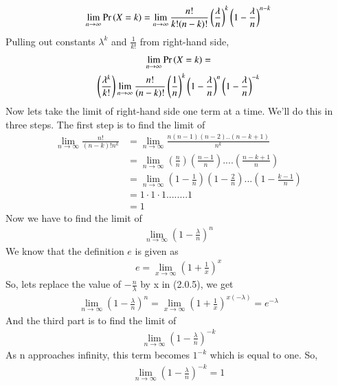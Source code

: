 \documentclass[journal,12pt,twocolumn]{IEEEtran}
\begin{document}
\begin{align}
   \lim_{n \to \infty}\Pr\left(X=k\right)=\lim_{n \to \infty}\frac{n!}{k!(n-k)!}\left(\frac{\lambda}{n}\right)^k\left(1-\frac{\lambda}{n}\right)^{n-k}
\end{align}
Pulling out constants $\lambda^k$ and $\frac{1}{k!}$ from right-hand side,
\begin{multline}  
    \lim_{n \to \infty}\Pr\left(X=k\right)=\\
    \left(\frac{\lambda^k}{k!}\right)\lim_{n \to \infty}\frac{n!}{(n-k)!}\left(\frac{1}{n}\right)^k\left(1-\frac{\lambda}{n}\right)^n\left(1-\frac{\lambda}{n}\right)^{-k}
\end{multline}
Now lets take the limit of right-hand side one term at a time. We’ll do this in three steps. The first step is to find the limit of 
\begin{equation}
\begin{split}
     \lim_{n \to \infty}\frac{n!}{(n-k)!n^k}
     &= \lim_{n \to \infty}\frac{n(n-1)(n-2)..(n-k+1)}{n^k}\\
    & = \lim_{n \to\infty}\left(\frac{n}{n}\right)\left(\frac{n-1}{n}\right)....\left(\frac{n-k+1}{n}\right)\\
   &= \lim_{n \to \infty}\left(1-\frac{1}{n}\right)\left(1-\frac{2}{n}\right)...\left(1-\frac{k-1}{n}\right)\\
    &=1\cdot1\cdot1........1\\
    &=1   
    \end{split}
\end{equation}
Now we have to find the limit of 
\begin{align}
    \lim_{n \to \infty}\left(1-\frac{\lambda}{n}\right)^n 
\end{align}
We know that the definition $e$ is given as 
\begin{align}
    e=\lim_{x \to \infty}\left(1+\frac{1}{x}\right)^x
\end{align}
So, lets replace the value of $-\frac{n}{\lambda}$ by x in (2.0.5), we get
\begin{align}
    \lim_{n \to \infty}\left(1-\frac{\lambda}{n}\right)^n =\lim_{x \to \infty}\left(1+\frac{1}{x}\right)^{x(-\lambda)}=e^{-\lambda}
\end{align}
And the third part is to find the limit of 
\begin{align}
    \lim_{n \to \infty}\left(1-\frac{\lambda}{n}\right)^{-k}
\end{align}
As n approaches infinity, this term becomes $1^{-k}$ which is equal to one.
So,
\begin{align}
    \lim_{n \to \infty}\left(1-\frac{\lambda}{n}\right)^{-k}=1
\end{align}\\
\end{document}
